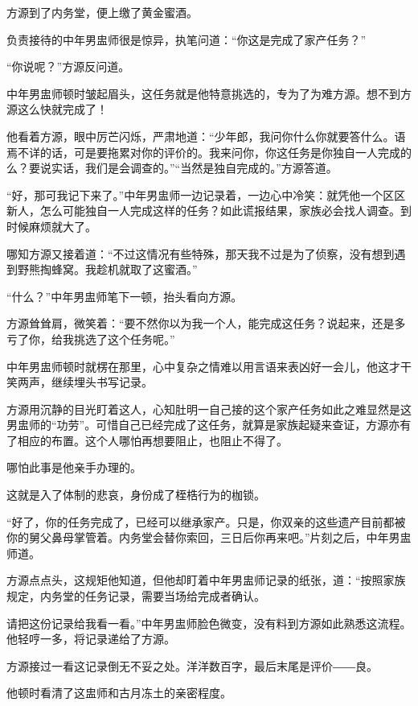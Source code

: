 
\begin{this_body}

方源到了内务堂，便上缴了黄金蜜酒。

负责接待的中年男盅师很是惊异，执笔问道：“你这是完成了家产任务？”

“你说呢？”方源反问道。

中年男盅师顿时皱起眉头，这任务就是他特意挑选的，专为了为难方源。想不到方源这么快就完成了！

他看着方源，眼中厉芒闪烁，严肃地道：“少年郎，我问你什么你就要答什么。语焉不详的话，可是要拖累对你的评价的。我来问你，你这任务是你独自一人完成的么？要说实话，我们是会调查的。”“当然是独自完成的。”方源答道。

“好，那可我记下来了。”中年男盅师一边记录着，一边心中冷笑：就凭他一个区区新人，怎么可能独自一人完成这样的任务？如此谎报结果，家族必会找人调查。到时候麻烦就大了。

哪知方源又接着道：“不过这情况有些特殊，那天我不过是为了侦察，没有想到遇到野熊掏蜂窝。我趁机就取了这蜜酒。”

“什么？”中年男盅师笔下一顿，抬头看向方源。

方源耸耸肩，微笑着：“要不然你以为我一个人，能完成这任务？说起来，还是多亏了你，给我挑选了这个任务呢。”

中年男盅师顿时就楞在那里，心中复杂之情难以用言语来表凶好一会儿，他这才干笑两声，继续埋头书写记录。

方源用沉静的目光盯着这人，心知肚明一自己接的这个家产任务如此之难显然是这男盅师的“功劳”。可惜自己已经完成了这任务，就算是家族起疑来查证，方源亦有了相应的布置。这个人哪怕再想要阻止，也阻止不得了。

哪怕此事是他亲手办理的。

这就是入了体制的悲哀，身份成了桎梏行为的枷锁。

“好了，你的任务完成了，已经可以继承家产。只是，你双亲的这些遗产目前都被你的舅父鼻母掌管着。内务堂会替你索回，三日后你再来吧。”片刻之后，中年男盅师道。

方源点点头，这规矩他知道，但他却盯着中年男盅师记录的纸张，道：“按照家族规定，内务堂的任务记录，需要当场给完成者确认。

请把这份记录给我看一看。”中年男盅师脸色微变，没有料到方源如此熟悉这流程。他轻哼一多，将记录递给了方源。

方源接过一看这记录倒无不妥之处。洋洋数百字，最后末尾是评价――良。

他顿时看清了这盅师和古月冻土的亲密程度。


\end{this_body}
